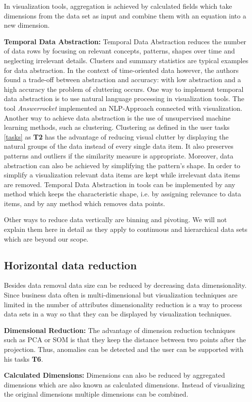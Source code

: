 In visualization tools, aggregation is achieved by calculated fields which take dimensions from the data set as input and combine them with an equation into a new dimension.
\par
\textbf{Temporal Data Abstraction: }\label{temporalabstraction}
Temporal Data Abstraction  \cite{Aigner2011} reduces the number of data rows by focusing on relevant concepts, patterns, shapes over time and neglecting irrelevant details. Clusters and summary statistics  \cite{PiringerHarald2011} are typical examples for data abstraction. In the context of time-oriented data however, the authors found a trade-off between abstraction and accuracy: with low abstraction and a high accuracy the problem of cluttering occurs. 
One way to implement temporal data abstraction is to use natural language processing in visualization tools. The tool \textit{Answerrocket} implemented an NLP-Approach connected with visualization. Another way to achieve data abstraction is the use of unsupervised machine learning methods, such as clustering.
Clustering as defined in the user tasks \ref{tasks} as \textbf{T2} has the advantage of reducing visual clutter by displaying the natural groups of the data instead of every single data item. It also preserves patterns and outliers if the similarity measure is appropriate.
Moreover, data abstraction can also be achieved by simplifying the pattern's shape. In order to simplify a visualization relevant data items are kept while irrelevant data items are removed. Temporal Data Abstraction in tools can be implemented by any method which keeps the characteristic shape, i.e. by assigning relevance to data items, and by any method which removes data points. \par

Other ways to reduce data vertically are binning and pivoting. We will not explain them here in detail as they apply to continuous and hierarchical data sets which are beyond our scope. 

\subsection{Horizontal data reduction}
Besides data removal data size can be reduced by decreasing data dimensionality. Since business data often is multi-dimensional but visualization techniques are limited in the number of attributes dimensionality reduction is a way to process data sets in a way so that they can be displayed by visualization techniques. \par
\textbf{Dimensional Reduction:} The advantage of dimension reduction techniques such as \gls{PCA} or \gls{SOM} is that they keep the distance between two points after the projection. Thus, anomalies can be detected and the user can be supported with his tasks \textbf{T6}.
\par
\textbf{Calculated Dimensions: }Dimensions can also be reduced by aggregated dimensions which are also known as calculated dimensions. Instead of visualizing the original dimensions multiple dimensions can be combined.
\par


